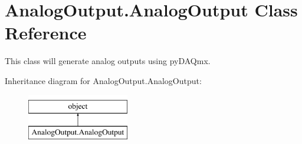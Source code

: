 \hypertarget{class_analog_output_1_1_analog_output}{\section{Analog\-Output.\-Analog\-Output Class Reference}
\label{class_analog_output_1_1_analog_output}
}


This class will generate analog outputs using py\-D\-A\-Qmx.  


Inheritance diagram for Analog\-Output.\-Analog\-Output\-:\begin{figure}[H]
\begin{center}
\leavevmode
\includegraphics[height=2.000000cm]{class_analog_output_1_1_analog_output}
\end{center}
\end{figure}
